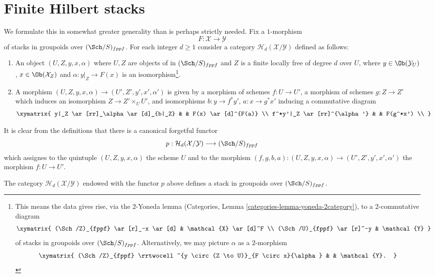 \section{Finite Hilbert stacks}
\label{section-hilbert-d-stack}

\noindent
We formulate this in somewhat greater generality than is perhaps strictly
needed. Fix a $1$-morphism
$$
F : \mathcal{X} \longrightarrow \mathcal{Y}
$$
of stacks in groupoids over $(\Sch/S)_{fppf}$. For each integer
$d \geq 1$ consider a category $\mathcal{H}_d(\mathcal{X}/\mathcal{Y})$
defined as follows:
\begin{enumerate}
\item An object $(U, Z, y, x, \alpha)$ where $U, Z$ are objects of
in $(\Sch/S)_{fppf}$ and $Z$ is a finite locally free of degree
$d$ over $U$, where
$y \in \Ob(\mathcal{Y}_U)$, $x \in \Ob(\mathcal{X}_Z)$
and $\alpha : y|_Z \to F(x)$ is an isomorphism\footnote{
This means the data gives rise, via the $2$-Yoneda lemma
(Categories, Lemma \ref{categories-lemma-yoneda-2category}), to a
$2$-commutative diagram
$$
\xymatrix{
(\Sch/Z)_{fppf} \ar[r]_-x \ar[d] & \mathcal{X} \ar[d]^F \\
(\Sch/U)_{fppf} \ar[r]^-y & \mathcal{Y}
}
$$
of stacks in groupoids over $(\Sch/S)_{fppf}$.
Alternatively, we may picture $\alpha$ as a $2$-morphism
$$
\xymatrix{
(\Sch/Z)_{fppf}
\rrtwocell^{y \circ (Z \to U)}_{F \circ x}{\alpha} & &
\mathcal{Y}.
}
$$
}.
\item A morphism $(U, Z, y, x, \alpha) \to (U', Z', y', x', \alpha')$ is
given by a morphism of schemes $f : U \to U'$, a morphism of schemes
$g : Z \to Z'$ which induces an isomorphism $Z \to Z' \times_U U'$,
and isomorphisms $b : y \to f^*y'$, $a : x \to g^*x'$ inducing a commutative
diagram
$$
\xymatrix{
y|_Z \ar[rr]_\alpha \ar[d]_{b|_Z} & &
F(x) \ar[d]^{F(a)} \\
f^*y'|_Z \ar[rr]^{\alpha'} & &
F(g^*x') \\
}
$$
\end{enumerate}
It is clear from the definitions that there is a canonical
forgetful functor
$$
p :
\mathcal{H}_d(\mathcal{X}/\mathcal{Y})
\longrightarrow
(\Sch/S)_{fppf}
$$
which assignes to the quintuple $(U, Z, y, x, \alpha)$ the scheme $U$
and to the morphism
$(f, g, b, a) : (U, Z, y, x, \alpha) \to (U', Z', y', x', \alpha')$
the morphism $f : U \to U'$.

\begin{lemma}
\label{lemma-hilbert-d-stack}
The category $\mathcal{H}_d(\mathcal{X}/\mathcal{Y})$ endowed with
the functor $p$ above defines a stack in groupoids over
$(\Sch/S)_{fppf}$.
\end{lemma}

